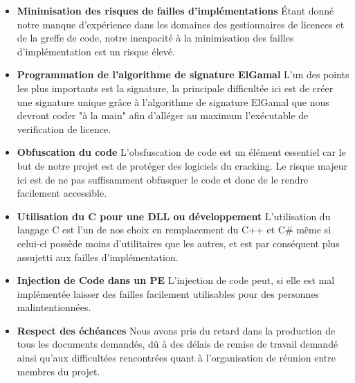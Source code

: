 \begin{itemize}
	\item \textbf{Minimisation des risques de failles d'implémentations} \newline
	Étant donné notre manque d'expérience dans les domaines des gestionnaires de licences
	et de la greffe de code, notre incapacité à la minimisation des failles d'implémentation est un risque élevé.\newline
	
	\item \textbf{Programmation de l'algorithme de signature ElGamal} \newline
	L'un des points les plus importants est la signature, la principale difficultée ici est de créer une signature unique grâce à 
	l'algorithme de signature ElGamal que nous devront coder "à la main" afin d'alléger au maximum l'exécutable de verification de licence.	\newline
	
	\item \textbf{Obfuscation du code} \newline
	L'obsfuscation de code est un élément essentiel car le but de notre projet est de protéger des logiciels du cracking. 
	Le risque majeur ici est de ne pas suffisamment obfusquer le code et donc de le rendre facilement accessible.\newline
	
	\item \textbf{Utilisation du C pour une DLL ou développement} \newline
	L'utilisation du langage C est l'un de nos choix en remplacement du C++ et C\# même si celui-ci possède moins d'utilitaires 
	que les autres, et est par conséquent plus assujetti aux failles d'implémentation.\newline
	
	\item \textbf{Injection de Code dans un PE} \newline
	L'injection de code peut, si elle est mal implémentée laisser des failles facilement utilisables pour des personnes malintentionnées.\newline
	
	\item \textbf{Respect des échéances} \newline
	Nous avons pris du retard dans la production de tous les documents demandés, dû à des délais de remise de travail demandé ainsi qu'aux 
	difficultées rencontrées quant à l'organisation de réunion entre membres du projet.\newline
\end{itemize}

